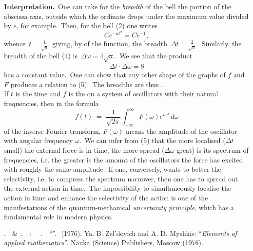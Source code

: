 \documentclass[12pt]{article}
\begin{document}
\textbf{Interpretation.}\, One can take for the {\em breadth} of the bell the portion of the abscissa axis, outside which the ordinate drops under the maximum value divided by $e$, for example.\, Then, for the bell (2) one writes
$$Ce^{-at^2} = Ce^{-1},$$
whence\, $t = \frac{1}{\sqrt{a}}$\, giving, by  of the function, the breadth\, $\Delta t = \frac{2}{\sqrt{a}}$.\, Similarly, the breadth of the bell (4) is\, $\Delta\omega = 4\sqrt{a}$.\, We see that the product
\begin{align}
\Delta t\cdot\Delta\omega = 8
\end{align}
has a constant value.\, One can show that any other shape of the graphs of $f$ and $F$ produces a relation  to (5).\, The breadths are thus .\\

If $t$ is the time and $f$ is the  on a system of oscillators with their natural frequencies, then in the formula
$$f(t) \;=\; \frac{1}{\sqrt{2\pi}}\int_{-\infty}^\infty F(\omega)e^{i\omega t}\,d\omega$$
of the inverse Fourier transform, $F(\omega)$ means the amplitude of the oscillator with angular frequency $\omega$.\, We can infer from (5) that the more localised ($\Delta t$ small) the external force is in time, the more spread ($\Delta\omega$ great) is its spectrum of frequencies, i.e. the greater is the amount of the oscillators the force has excited with roughly the same amplitude.\, If one, conversely, wants to better the selectivity, i.e. to compress the spectrum narrower, then one has to spread out the external action in time.\, The impossibility to simultaneously localise the action in time and enhance the selectivity of the action is one of the manifestations of the quantum-mechanical {\em uncertainty principle}, which has a fundamental role in modern physics.

\begin{thebibliography}{9}
 \CYRYA. \CYRB. \CYRZ\cyre\cyrl\cyrsftsn\cyrd\cyro\cyrv\cyri\cyrch \;\&\, \CYRA. \CYRD. \CYRM\cyrery\cyrsh\cyrk\cyri\cyrs: 
{\em \CYREREV\cyrl\cyre\cyrm\cyre\cyrn\cyrt\cyrery\, \cyrp\cyrr\cyri\cyrk\cyrl\cyra\cyrd\cyrn\cyro\cyrishrt\, \cyrm\cyra\cyrt\cyre\cyrm\cyra\cyrt\cyri\cyrk\cyri}. \,\CYRI\cyrz\cyrd\cyra\cyrt\cyre\cyrl\cyrsftsn\cyrs\cyrt\cyrv\cyro \,
``\CYRN\cyra\cyru\cyrk\cyra''.\, \CYRM\cyro\cyrs\cyrk\cyrv\cyra \,(1976).
Ya. B. Zel'dovich and A. D. Myshkis: ``{\em Elements of applied mathematics}''.
Nauka (Science) Publishers, Moscow (1976). 
\end{thebibliography}
  


\end{document}
